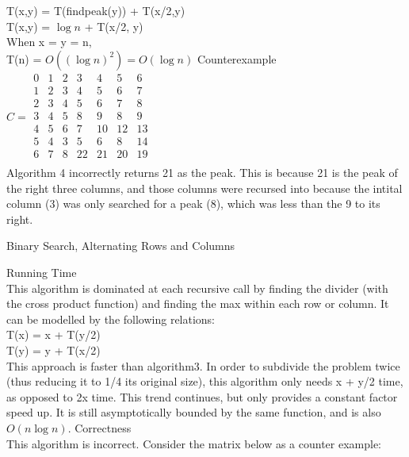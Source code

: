 \documentclass[12pt,twoside]{article}
\begin{document}
\begin{problems}
\begin{problemparts}
T(x,y) = T(findpeak(y)) + T(x/2,y)\\
T(x,y) = $\log n$ + T(x/2, y)\\
When x = y = n, \\
T(n) = $O( (\log n)^2 ) = O(\log n)$
\problempart Counterexample\\
$C = \begin{array}{ccccccc}
0 & 1&2&3&4&5&6 \\
1&2&3&4&5&6&7 \\
2&3&4&5&6&7&8\\
3&4&5&8&9&8&9\\
4&5&6&7&10&12&13\\
5&4&3&5&6&8&14\\
6&7&8&22&21&20&19\\
\end{array}$ 
\\
Algorithm 4 incorrectly returns 21 as the peak.  This is because 21 is the peak of the right three columns, and those columns were recursed into because the intital column (3) was only searched for a peak (8), which was less than the 9 to its right.  
\end{problemparts}
\problem Binary Search, Alternating Rows and Columns
\begin{problemparts}
\problempart Running Time\\
This algorithm is dominated at each recursive call by finding the divider (with the cross product function) and finding the max within each row or column.  It can be modelled by the following relations:\\
T(x) = x + T(y/2)\\
T(y) = y + T(x/2)\\
This approach is faster than algorithm3.  In order to subdivide the problem twice (thus reducing it to 1/4 its original size), this algorithm only needs x + y/2 time, as opposed to 2x time.  This trend continues, but only provides a constant factor speed up.  It is still asymptotically bounded by the same function, and is also $O(n \log n)$.
\problempart Correctness\\
This algorithm is incorrect.  Consider the matrix below as a counter example: \\


\end{problemparts}
\end{problems}
\end{document}

